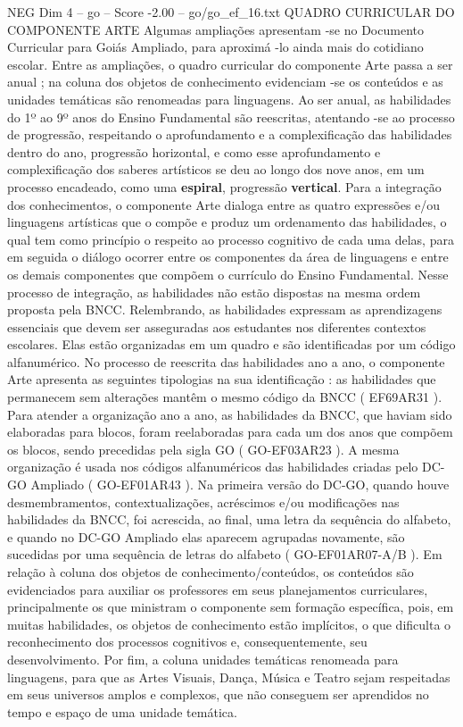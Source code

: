 \begin{textsample}{NEG Dim 4 – go – Score -2.00 – go/go\_ef\_16.txt}  \label{ex:f4_neg_228}
QUADRO CURRICULAR DO COMPONENTE ARTE Algumas ampliações apresentam -se no Documento Curricular para Goiás Ampliado, para aproximá -lo ainda mais do cotidiano escolar.
Entre as ampliações, o quadro curricular do componente Arte passa a ser anual ; na coluna dos objetos de conhecimento evidenciam -se os conteúdos e as unidades temáticas são renomeadas para linguagens.
Ao ser anual, as habilidades do 1º ao 9º anos do Ensino Fundamental são reescritas, atentando -se ao processo de progressão, respeitando o aprofundamento e a complexificação das habilidades dentro do ano, progressão horizontal, e como esse aprofundamento e complexificação dos saberes artísticos se deu ao longo dos nove anos, em um processo encadeado, como uma \textbf{espiral}, progressão \textbf{vertical}.
Para a integração dos conhecimentos, o componente Arte dialoga entre as quatro expressões e/ou linguagens artísticas que o compõe e produz um ordenamento das habilidades, o qual tem como princípio o respeito ao processo cognitivo de cada uma delas, para em seguida o diálogo ocorrer entre os componentes da área de linguagens e entre os demais componentes que compõem o currículo do Ensino Fundamental.
Nesse processo de integração, as habilidades não estão dispostas na mesma ordem proposta pela BNCC.
Relembrando, as habilidades expressam as aprendizagens essenciais que devem ser asseguradas aos estudantes nos diferentes contextos escolares.
Elas estão organizadas em um quadro e são identificadas por um código alfanumérico.
No processo de reescrita das habilidades ano a ano, o componente Arte apresenta as seguintes tipologias na sua identificação : as habilidades que permanecem sem alterações mantêm o mesmo código da BNCC ( EF69AR31 ).
Para atender a organização ano a ano, as habilidades da BNCC, que haviam sido elaboradas para blocos, foram reelaboradas para cada um dos anos que compõem os blocos, sendo precedidas pela sigla GO ( GO-EF03AR23 ).
A mesma organização é usada nos códigos alfanuméricos das habilidades criadas pelo DC-GO Ampliado ( GO-EF01AR43 ).
Na primeira versão do DC-GO, quando houve desmembramentos, contextualizações, acréscimos e/ou modificações nas habilidades da BNCC, foi acrescida, ao final, uma letra da sequência do alfabeto, e quando no DC-GO Ampliado elas aparecem agrupadas novamente, são sucedidas por uma sequência de letras do alfabeto ( GO-EF01AR07-A/B ).
Em relação à coluna dos objetos de conhecimento/conteúdos, os conteúdos são evidenciados para auxiliar os professores em seus planejamentos curriculares, principalmente os que ministram o componente sem formação específica, pois, em muitas habilidades, os objetos de conhecimento estão implícitos, o que dificulta o reconhecimento dos processos cognitivos e, consequentemente, seu desenvolvimento.
Por fim, a coluna unidades temáticas renomeada para linguagens, para que as Artes Visuais, Dança, Música e Teatro sejam respeitadas em seus universos amplos e complexos, que não conseguem ser aprendidos no tempo e espaço de uma unidade temática.

\end{textsample}
